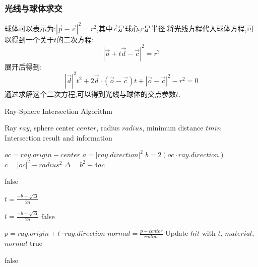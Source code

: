 \documentclass[a4paper,twoside]{article}
\begin{document}
\subsubsection{光线与球体求交}
球体可以表示为:$|\vec{p} - \vec{c}|^2 = r^2$,其中$\vec{c}$是球心,$r$是半径.将光线方程代入球体方程,可以得到一个关于$t$的二次方程:
\begin{equation}
    |\vec{o} + t\vec{d} - \vec{c}|^2 = r^2
\end{equation}展开后得到:
\begin{equation}
    |\vec{d}|^2 t^2 + 2\vec{d} \cdot (\vec{o} - \vec{c})t + |\vec{o} - \vec{c}|^2 - r^2 = 0
\end{equation}
通过求解这个二次方程,可以得到光线与球体的交点参数$t$.
\begin{algorithm}[H]
    \caption{Ray-Sphere Intersection Algorithm}
    \label{alg:ray_sphere}
    \begin{algorithmic}[1]
        \REQUIRE Ray $ray$, sphere center $center$, radius $radius$, minimum distance $tmin$
        \ENSURE Intersection result and information
        
        \STATE $oc = ray.origin - center$
        \STATE $a = |ray.direction|^2$
        \STATE $b = 2(oc \cdot ray.direction)$
        \STATE $c = |oc|^2 - radius^2$
        \STATE $\Delta = b^2 - 4ac$
        
            \RETURN false
        \ENDIF
        
        \STATE $t = \frac{-b - \sqrt{\Delta}}{2a}$
        
            \STATE $t = \frac{-b + \sqrt{\Delta}}{2a}$
             \RETURN false \ENDIF
        \ENDIF
        
            \STATE $p = ray.origin + t \cdot ray.direction$
            \STATE $normal = \frac{p - center}{radius}$
            \STATE Update $hit$ with $t$, $material$, $normal$
            \RETURN true
        \ENDIF
        
        \RETURN false
    \end{algorithmic}
\end{algorithm}
\end{document}
